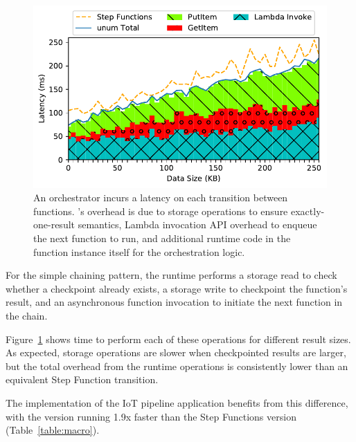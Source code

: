 \begin{figure}[t]
  \centering
  \includegraphics[width=\columnwidth]{figures/TotalAdditionalLatencyNBreakdown.pdf}
  \caption{An orchestrator incurs a latency on each transition between
functions. \name{}'s overhead is due to storage operations to ensure
exactly-one-result semantics, Lambda invocation API overhead to enqueue the
next function to run, and additional \name{} runtime code in the function
instance itself for the orchestration logic.}
  \label{fig:single-transition-latency-breakdown}
\end{figure}

For the simple chaining pattern, the \name{} runtime performs a storage read to
check whether a checkpoint already exists, a storage write to checkpoint the
function's result, and an asynchronous function invocation to initiate the next
function in the chain.

Figure~\ref{fig:single-transition-latency-breakdown} shows time to perform each
of these operations for different result sizes. As expected, storage operations
are slower when checkpointed results are larger, but the total overhead from the
\name{} runtime operations is consistently lower than an equivalent Step
Function transition.


The \name{} implementation of the IoT pipeline application benefits from this
difference, with the \name{} version running 1.9x faster than the Step Functions
version (Table~\ref{table:macro}).

